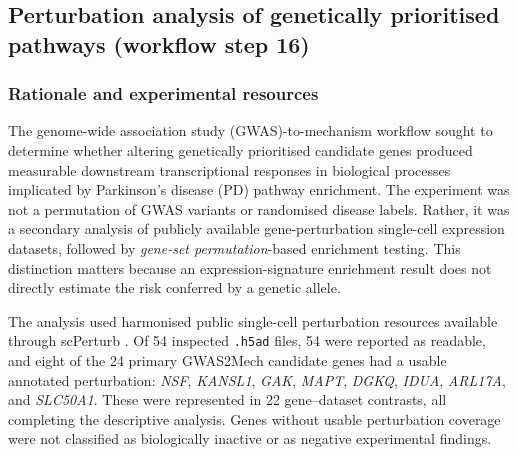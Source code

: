 \documentclass[11pt,a4paper]{article}
\begin{document}
\subsection{Perturbation analysis of genetically prioritised pathways (workflow step 16)}
\label{sec:gwas2mech_step16}
\subsubsection{Rationale and experimental resources}
\label{subsec:step16_rationale}
The genome-wide association study (GWAS)-to-mechanism workflow sought to determine whether altering genetically prioritised candidate genes produced measurable downstream transcriptional responses in biological processes implicated by Parkinson's disease (PD) pathway enrichment. The experiment was not a permutation of GWAS variants or randomised disease labels. Rather, it was a secondary analysis of publicly available gene-perturbation single-cell expression datasets, followed by \emph{gene-set permutation}-based enrichment testing. This distinction matters because an expression-signature enrichment result does not directly estimate the risk conferred by a genetic allele.

The analysis used harmonised public single-cell perturbation resources available through scPerturb \cite{Peidli2024scPerturb}. Of 54 inspected \texttt{.h5ad} files, 54 were reported as readable, and eight of the 24 primary GWAS2Mech candidate genes had a usable annotated perturbation: \textit{NSF}, \textit{KANSL1}, \textit{GAK}, \textit{MAPT}, \textit{DGKQ}, \textit{IDUA}, \textit{ARL17A}, and \textit{SLC50A1}. These were represented in 22 gene--dataset contrasts, all completing the descriptive analysis. Genes without usable perturbation coverage were not classified as biologically inactive or as negative experimental findings.
\end{document}
